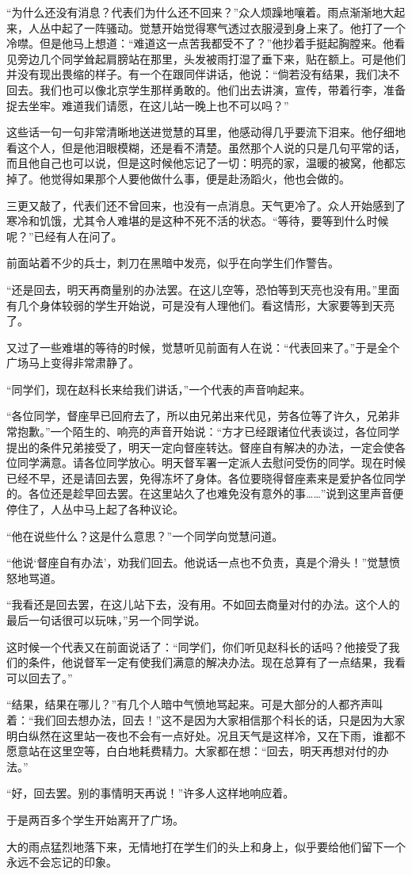\par “为什么还没有消息？代表们为什么还不回来？”众人烦躁地嚷着。雨点渐渐地大起来，人丛中起了一阵骚动。觉慧开始觉得寒气透过衣服浸到身上来了。他打了一个冷噤。但是他马上想道：“难道这一点苦我都受不了？”他抄着手挺起胸膛来。他看见旁边几个同学耸起肩膀站在那里，头发被雨打湿了垂下来，贴在额上。可是他们并没有现出畏缩的样子。有一个在跟同伴讲话，他说：“倘若没有结果，我们决不回去。我们也可以像北京学生那样勇敢的。他们出去讲演，宣传，带着行李，准备捉去坐牢。难道我们请愿，在这儿站一晚上也不可以吗？”
\par 这些话一句一句非常清晰地送进觉慧的耳里，他感动得几乎要流下泪来。他仔细地看这个人，但是他泪眼模糊，还是看不清楚。虽然那个人说的只是几句平常的话，而且他自己也可以说，但是这时候他忘记了一切：明亮的家，温暖的被窝，他都忘掉了。他觉得如果那个人要他做什么事，便是赴汤蹈火，他也会做的。
\par 三更又敲了，代表们还不曾回来，也没有一点消息。天气更冷了。众人开始感到了寒冷和饥饿，尤其令人难堪的是这种不死不活的状态。“等待，要等到什么时候呢？”已经有人在问了。
\par 前面站着不少的兵士，刺刀在黑暗中发亮，似乎在向学生们作警告。
\par “还是回去，明天再商量别的办法罢。在这儿空等，恐怕等到天亮也没有用。”里面有几个身体较弱的学生开始说，可是没有人理他们。看这情形，大家要等到天亮了。
\par 又过了一些难堪的等待的时候，觉慧听见前面有人在说：“代表回来了。”于是全个广场马上变得非常肃静了。
\par “同学们，现在赵科长来给我们讲话，”一个代表的声音响起来。
\par “各位同学，督座早已回府去了，所以由兄弟出来代见，劳各位等了许久，兄弟非常抱歉。”一个陌生的、响亮的声音开始说：“方才已经跟诸位代表谈过，各位同学提出的条件兄弟接受了，明天一定向督座转达。督座自有解决的办法，一定会使各位同学满意。请各位同学放心。明天督军署一定派人去慰问受伤的同学。现在时候已经不早，还是请回去罢，免得冻坏了身体。各位要晓得督座素来是爱护各位同学的。各位还是趁早回去罢。在这里站久了也难免没有意外的事……”说到这里声音便停住了，人丛中马上起了各种议论。
\par “他在说些什么？这是什么意思？”一个同学向觉慧问道。
\par “他说‘督座自有办法’，劝我们回去。他说话一点也不负责，真是个滑头！”觉慧愤怒地骂道。
\par “我看还是回去罢，在这儿站下去，没有用。不如回去商量对付的办法。这个人的最后一句话很可以玩味，”另一个同学说。
\par 这时候一个代表又在前面说话了：“同学们，你们听见赵科长的话吗？他接受了我们的条件，他说督军一定有使我们满意的解决办法。现在总算有了一点结果，我看可以回去了。”
\par “结果，结果在哪儿？”有几个人暗中气愤地骂起来。可是大部分的人都齐声叫着：“我们回去想办法，回去！”这不是因为大家相信那个科长的话，只是因为大家明白纵然在这里站一夜也不会有一点好处。况且天气是这样冷，又在下雨，谁都不愿意站在这里空等，白白地耗费精力。大家都在想：“回去，明天再想对付的办法。”
\par “好，回去罢。别的事情明天再说！”许多人这样地响应着。
\par 于是两百多个学生开始离开了广场。
\par 大的雨点猛烈地落下来，无情地打在学生们的头上和身上，似乎要给他们留下一个永远不会忘记的印象。


